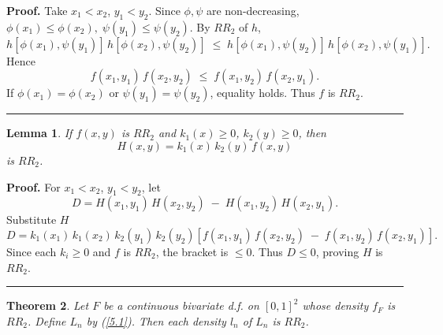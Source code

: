 \documentclass[onecolumn]{article}
\newtheorem{theorem}{Theorem}
\newtheorem{lemma}[theorem]{Lemma}
\newenvironment{proof}[1][Proof]{\noindent\textbf{#1.} }{\ \rule{0.5em}{0.5em}}
\begin{document}
\begin{proof}
Take $x_{1}<x_{2}$, $y_{1}<y_{2}$. Since $\phi ,\psi $ are non-decreasing, $%
\phi (x_{1})\leq \phi (x_{2}),\;\psi (y_{1})\leq \psi (y_{2})$. By $RR_{2}$
of $h$, 
\begin{equation}
h[\phi (x_{1}),\psi (y_{1})]\,h[\phi (x_{2}),\psi (y_{2})]\;\leq \;h[\phi
(x_{1}),\psi (y_{2})]\,h[\phi (x_{2}),\psi (y_{1})].  \label{324}
\end{equation}%
Hence 
\begin{equation}
f(x_{1},y_{1})\,f(x_{2},y_{2})\;\leq \;f(x_{1},y_{2})\,f(x_{2},y_{1}).
\label{325}
\end{equation}%
If $\phi (x_{1})=\phi (x_{2})$ or $\psi (y_{1})=\psi (y_{2})$, equality
holds. Thus $f$ is $RR_{2}$. \hfill
\end{proof}

\begin{lemma}
\label{ker} If $f(x,y)$ is $RR_{2}$ and $k_{1}(x)\geq 0$, $k_{2}(y)\geq 0$,
then 
\begin{equation}
H(x,y)=k_{1}(x)\,k_{2}(y)\,f(x,y)  \label{326}
\end{equation}%
is $RR_{2}$.
\end{lemma}

\begin{proof}
\noindent For $x_{1}<x_{2}$, $y_{1}<y_{2}$, let 
\begin{equation}
D=H(x_{1},y_{1})\,H(x_{2},y_{2})\;-\;H(x_{1},y_{2})\,H(x_{2},y_{1}).
\label{327}
\end{equation}%
Substitute $H$ 
\begin{equation}
D=k_{1}(x_{1})\,k_{1}(x_{2})\,k_{2}(y_{1})\,k_{2}(y_{2})[f(x_{1},y_{1})%
\,f(x_{2},y_{2})\;-\;f(x_{1},y_{2})\,f(x_{2},y_{1})].  \label{328}
\end{equation}%
Since each $k_{i}\geq 0$ and $f$ is $RR_{2}$, the bracket is $\leq 0$. Thus $%
D\leq 0$, proving $H$ is $RR_{2}$. \hfill
\end{proof}

\begin{theorem}
\label{rr2-pres} Let $F$ be a continuous bivariate d.f. on $[0,1]^{2}$ whose
density $f_{F}$ is $RR_{2}$. Define $L_{n}$ by (\ref{5.1}). Then each
density $l_{n}$ of $L_{n}$ is $RR_{2}$.
\end{theorem}
\end{document}
